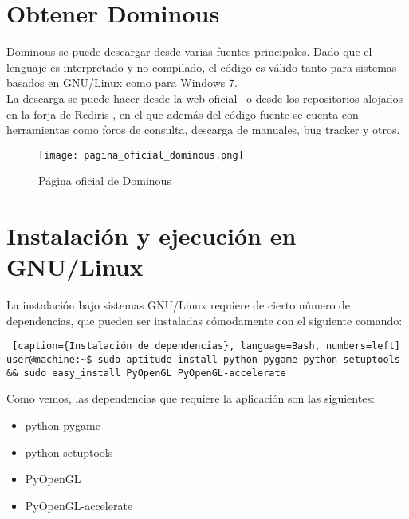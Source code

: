 

\section{Obtener Dominous}

Dominous se puede descargar desde varias fuentes principales. Dado que el lenguaje es interpretado y no compilado, el código
es válido tanto para sistemas basados en GNU/Linux como para Windows 7. \\

La descarga se puede hacer desde la web oficial~\cite{website:dominous} o desde los repositorios alojados en la 
forja de Rediris , en el que además del código fuente se cuenta con
herramientas como foros de consulta, descarga de manuales, bug tracker y otros.

\begin{figure}[h]
  \begin{center}
    \texttt{[image: pagina\_oficial\_dominous.png]}
  \end{center}
  \caption{Página oficial de Dominous}
  \label{fig:pagina_oficial_dominous}
\end{figure}

\section{Instalación y ejecución en GNU/Linux}

La instalación bajo sistemas GNU/Linux requiere de cierto número de dependencias, que pueden ser instaladas cómodamente
con el siguiente comando:

\begin{lstlisting} [caption={Instalación de dependencias}, language=Bash, numbers=left]
user@machine:~$ sudo aptitude install python-pygame python-setuptools && sudo easy_install PyOpenGL PyOpenGL-accelerate
\end{lstlisting}

Como vemos, las dependencias que requiere la aplicación son las siguientes:

\begin{itemize}
    \item python-pygame
    \item python-setuptools
    \item PyOpenGL
    \item PyOpenGL-accelerate
\end{itemize}

